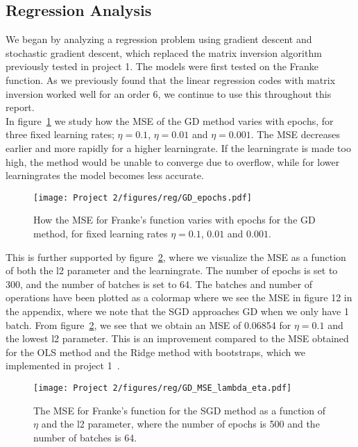 \documentclass[english,notitlepage,reprint,nofootinbib]{revtex4-2}  %
\begin{document}
\subsection*{Regression Analysis}
We began by analyzing a regression problem using gradient descent and stochastic gradient descent, which replaced the matrix inversion algorithm previously tested in project 1. 
The models were first tested on the Franke function. 
As we previously found that the linear regression codes with matrix inversion worked well for an order 6, we continue to use this throughout this report. 
\vspace{3mm}
\\ 
In figure~\ref{fig: a1} we study how the MSE of the GD method varies with epochs, for three fixed learning rates; $\eta=0.1$, $\eta=0.01$ and $\eta=0.001$. The MSE decreases earlier and more rapidly for a higher learningrate. If the learningrate is made too high, the method would be unable to converge due to overflow, while for lower learningrates the model becomes less accurate. 
\begin{figure}[h!]
    \centering %
    \texttt{[image: Project 2/figures/reg/GD\_epochs.pdf]} 
    \caption{How the MSE for Franke's function varies with epochs for the GD method, for fixed learning rates $\eta=0.1$, $0.01$ and $0.001$. }
    \label{fig: a1}
\end{figure}
This is further supported by figure~\ref{fig: a2}, where we visualize the MSE as a function of both the l2 parameter and the learningrate. The number of epochs is set to 300, and the number of batches is set to 64. The batches and number of operations have been plotted as a colormap where we see the MSE in figure 12
in the appendix, where we note that the SGD approaches GD when we only have 1 batch. 
From figure~\ref{fig: a2}, we see that we obtain an MSE of 0.06854 for $\eta=0.1$ and the lowest l2 parameter. This is an improvement compared to the MSE obtained for the OLS method and the Ridge method with bootstraps, which we implemented in project 1~\cite{proj1}. 
\begin{figure}[h!]
    \centering %
    \texttt{[image: Project 2/figures/reg/GD\_MSE\_lambda\_eta.pdf]} 
    \caption{The MSE for Franke's function for the SGD method as a function of $\eta$ and the l2 parameter, where the number of epochs is 500 and the number of batches is 64.}
    \label{fig: a2}
\end{figure}
\end{document}
